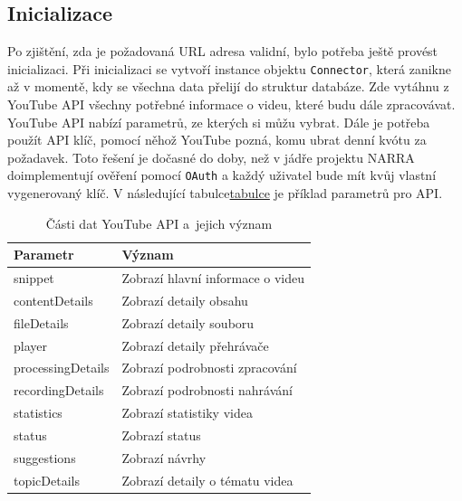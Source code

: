 \subsection{Inicializace}
\par Po zjištění, zda je požadovaná URL adresa validní, bylo potřeba ještě provést inicializaci. Při inicializaci se vytvoří instance objektu \texttt{Connector}, která zanikne až v momentě, kdy se všechna data přelijí do struktur databáze. Zde vytáhnu z YouTube API všechny potřebné informace o videu, které budu dále zpracovávat. YouTube API nabízí parametrů, ze kterých si můžu vybrat. Dále je potřeba použít API klíč\cite{apistart}, pomocí něhož YouTube pozná, komu ubrat denní kvótu za požadavek. Toto řešení je dočasné do doby, než v jádře projektu NARRA doimplementují ověření pomocí \texttt{OAuth} a každý uživatel bude mít kvůj vlastní vygenerovaný klíč. V následující tabulce\hyperlink{apiparams}{tabulce} je příklad parametrů pro API.

\begin{table}[h!]
\hypertarget{apiparams}{}
\centering
\begin{tabular}{| l | l |}
\hline
\textbf{Parametr} & \textbf{Význam} \\
\hline
snippet & Zobrazí hlavní informace o videu \\
\hline
contentDetails & Zobrazí detaily obsahu \\
\hline
fileDetails & Zobrazí detaily souboru \\
\hline
player & Zobrazí detaily přehrávače \\
\hline
processingDetails & Zobrazí podrobnosti zpracování \\
\hline
recordingDetails & Zobrazí podrobnosti nahrávání \\
\hline
statistics & Zobrazí statistiky videa \\
\hline
status & Zobrazí status \\
\hline
suggestions & Zobrazí návrhy \\
\hline
topicDetails & Zobrazí detaily o tématu videa \\
\hline
\end{tabular}
\caption[Části dat YouTube API a~jejich význam]{Části dat YouTube API a~jejich význam}
\end{table}


